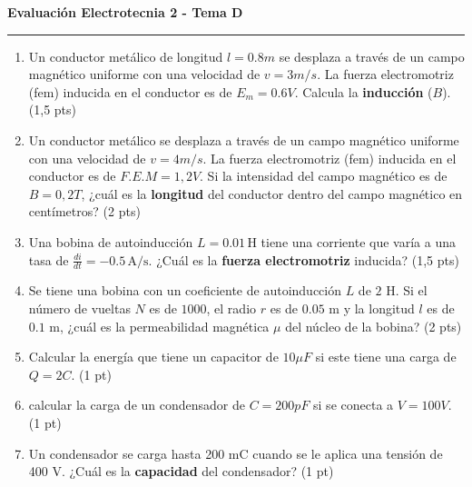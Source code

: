 \documentclass[a4paper,10pt]{article}
\begin{document}
\begin{minipage}[t][0.48\textheight][t]{0.48\textwidth}
  \centering \textbf{Evaluación Electrotecnia 2 - Tema D} \\
  \rule{\textwidth}{0.4pt}
  \begin{enumerate}
    \item Un conductor metálico de longitud $l=0.8 m$ se desplaza a
      través de un campo magnético uniforme con una velocidad de $v=3
      m/s$. La fuerza electromotriz (fem) inducida en el conductor es
      de $E_m=0.6 V$. Calcula la \textbf{inducción} ($B$). (1,5 pts)
    \item Un conductor metálico se desplaza a través de un campo
      magnético uniforme con una velocidad de $v=4 m/s$. La fuerza
      electromotriz (fem) inducida en el conductor es de $F.E.M=1,2
      V$. Si la intensidad del campo magnético es de $B=0,2 T$, ¿cuál
      es la \textbf{longitud} del conductor dentro del campo
      magnético en centímetros? (2 pts)
    \item Una bobina de autoinducción \( L = 0.01 \, \text{H} \)
      tiene una corriente que varía a una tasa de \( \frac{di}{dt} =
      -0.5 \, \text{A/s} \). ¿Cuál es la \textbf{fuerza
      electromotriz} inducida? (1,5 pts)
    \item Se tiene una bobina con un coeficiente de autoinducción $L$
      de $2$ H. Si el número de vueltas $N$ es de $1000$, el radio
      $r$ es de $0.05$ m y la longitud $l$ es de $0.1$ m, ¿cuál es la
      permeabilidad magnética $\mu$ del núcleo de la bobina? (2 pts)
    \item Calcular la energía que tiene un capacitor de $10\mu F$ si
      este tiene una carga de $Q=2C$. (1 pt)
    \item calcular la carga de un condensador de $C=200pF$ si se
      conecta a $V=100V$. (1 pt)
    \item Un condensador se carga hasta 200 mC cuando se le aplica
      una tensión de 400 V. ¿Cuál es la \textbf{capacidad} del
      condensador? (1 pt)
  \end{enumerate}
\end{minipage}
\end{document}
